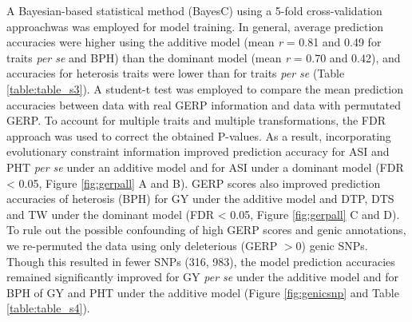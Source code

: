 \documentclass[9pt,twocolumn,twoside]{gsajnl}
\begin{document}
A Bayesian-based statistical method (BayesC) \citep{habier2011extension} using a 5-fold cross-validation approachwas was employed for model training. 
In general, average prediction accuracies were higher using the additive model (mean \emph{r} = 0.81 and 0.49 for traits \emph{per se} and BPH) than the dominant model (mean \emph{r} = 0.70 and 0.42), and accuracies for heterosis traits were lower than for traits \emph{per se} (Table \ref{table:table_s3}).  A student-t test was employed to compare the mean prediction accuracies between data with real GERP information and data with permutated GERP. To account for multiple traits and multiple transformations, the FDR approach was used to correct the obtained P-values. As a result, incorporating evolutionary constraint information improved prediction accuracy for ASI and PHT \emph{per se} under an additive model and for ASI under a dominant model (FDR < 0.05, Figure \ref{fig:gerpall} A and B).
GERP scores also improved prediction accuracies of heterosis (BPH) for GY under the additive model and DTP, DTS and TW under the dominant model (FDR < 0.05, Figure \ref{fig:gerpall} C and D). 
To rule out the possible confounding of high GERP scores and genic annotations, we re-permuted the data using only deleterious (GERP $> 0$) genic SNPs.  
Though this resulted in fewer SNPs (316, 983), the model prediction accuracies remained significantly improved for GY \emph{per se} under the additive model and for BPH of GY and PHT under the additive model (Figure \ref{fig:genicsnp} and Table \ref{table:table_s4}).   

\end{document}
